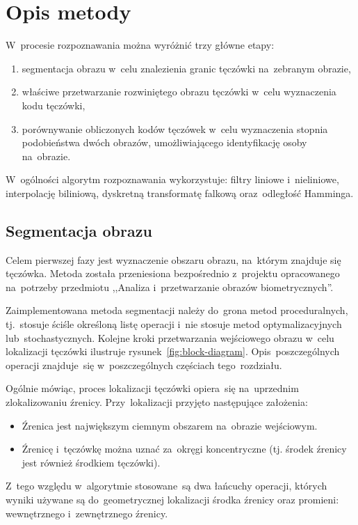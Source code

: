 \documentclass[11pt,a4paper]{article}
\begin{document}
\section{Opis metody}
\label{sec:method}

W~procesie rozpoznawania można wyróżnić trzy główne etapy:
\begin{enumerate}
    \item segmentacja obrazu w~celu znalezienia granic tęczówki na~zebranym obrazie,
    \item właściwe przetwarzanie rozwiniętego obrazu tęczówki w~celu wyznaczenia kodu tęczówki,
    \item porównywanie obliczonych kodów tęczówek w~celu wyznaczenia stopnia podobieństwa dwóch obrazów, umożliwiającego identyfikację osoby na~obrazie.
\end{enumerate}
W~ogólności algorytm rozpoznawania wykorzystuje: filtry liniowe i~nieliniowe, interpolację biliniową, dyskretną transformatę falkową oraz~odległość Hamminga.

\subsection{Segmentacja obrazu}

Celem pierwszej fazy jest wyznaczenie obszaru obrazu, na~którym znajduje się tęczówka.
Metoda została przeniesiona bezpośrednio z~projektu opracowanego na~potrzeby przedmiotu ,,Analiza i~przetwarzanie obrazów biometrycznych''.

Zaimplementowana metoda segmentacji należy do~grona metod proceduralnych, tj.~stosuje ściśle określoną listę operacji i~nie stosuje metod optymalizacyjnych lub~stochastycznych.
Kolejne kroki przetwarzania wejściowego obrazu w~celu lokalizacji tęczówki ilustruje rysunek~\ref{fig:block-diagram}.
Opis~poszczególnych operacji znajduje~się w~poszczególnych częściach tego~rozdziału.

Ogólnie mówiąc, proces lokalizacji tęczówki opiera~się na~uprzednim zlokalizowaniu źrenicy.
Przy~lokalizacji przyjęto następujące założenia:
\begin{itemize}
    \item Źrenica jest największym ciemnym obszarem na~obrazie wejściowym.
    \item Źrenicę i~tęczówkę można uznać za~okręgi koncentryczne (tj. środek źrenicy jest również środkiem tęczówki).
\end{itemize}
Z~tego względu w~algorytmie stosowane~są dwa łańcuchy operacji, których wyniki używane są do~geometrycznej lokalizacji środka źrenicy oraz promieni: wewnętrznego i~zewnętrznego źrenicy.
\end{document}
